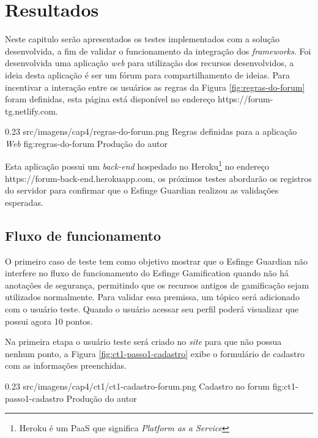 \newpage
\chapter{Resultados}

\par Neste capitulo serão apresentados os testes implementados com a solução desenvolvida, a fim de validar o funcionamento da integração dos \textit{frameworks}. Foi desenvolvida uma aplicação \textit{web} para utilização dos recursos desenvolvidos, a ideia desta aplicação é ser um fórum para compartilhamento de ideias. Para incentivar a interação entre os usuários as regras da Figura \ref{fig:regras-do-forum} foram definidas, esta página está disponível no endereço https://forum-tg.netlify.com.

\begin{image}
{0.23}
{src/imagens/cap4/regras-do-forum.png}
{Regras definidas para a aplicação \textit{Web}}
{fig:regras-do-forum}
{Produção do autor}
\end{image}

\par Esta aplicação possui um \textit{back-end} hospedado no Heroku\footnote{Heroku é um PaaS que significa \textit{Platform as a Service}} no endereço https://forum-back-end.herokuapp.com, os próximos testes abordarão os registros do servidor para confirmar que o Esfinge Guardian realizou as validações esperadas.

\section{Fluxo de funcionamento}

\par O primeiro caso de teste tem como objetivo mostrar que o Esfinge Guardian não interfere no fluxo de funcionamento do Esfinge Gamification quando não há anotações de segurança, permitindo que os recursos antigos de gamificação sejam utilizados normalmente. Para validar essa premissa, um tópico será adicionado com o usuário teste. Quando o usuário acessar seu perfil poderá visualizar que possui agora 10 pontos.

\par Na primeira etapa o usuário teste será criado no \textit{site} para que não possua nenhum ponto, a Figura \ref{fig:ct1-passo1-cadastro} exibe o formulário de cadastro com as informações preenchidas.

\begin{image}
{0.23}
{src/imagens/cap4/ct1/ct1-cadastro-forum.png}
{Cadastro no forum}
{fig:ct1-passo1-cadastro}
{Produção do autor}
\end{image}

